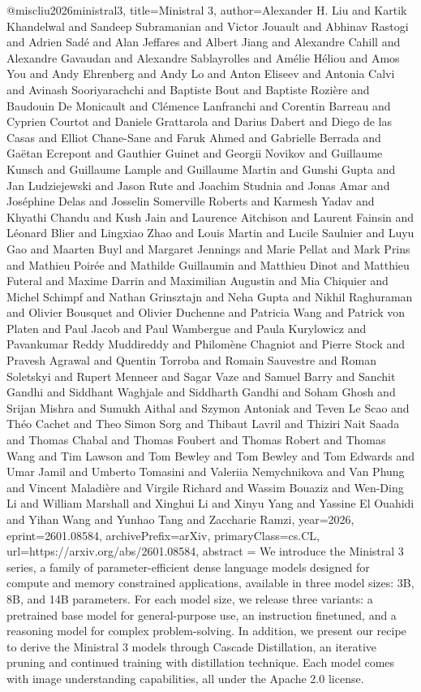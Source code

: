 {}@misc{liu2026ministral3,
      title={Ministral 3}, 
      author={Alexander H. Liu and Kartik Khandelwal and Sandeep Subramanian and Victor Jouault and Abhinav Rastogi and Adrien Sadé and Alan Jeffares and Albert Jiang and Alexandre Cahill and Alexandre Gavaudan and Alexandre Sablayrolles and Amélie Héliou and Amos You and Andy Ehrenberg and Andy Lo and Anton Eliseev and Antonia Calvi and Avinash Sooriyarachchi and Baptiste Bout and Baptiste Rozière and Baudouin De Monicault and Clémence Lanfranchi and Corentin Barreau and Cyprien Courtot and Daniele Grattarola and Darius Dabert and Diego de las Casas and Elliot Chane-Sane and Faruk Ahmed and Gabrielle Berrada and Gaëtan Ecrepont and Gauthier Guinet and Georgii Novikov and Guillaume Kunsch and Guillaume Lample and Guillaume Martin and Gunshi Gupta and Jan Ludziejewski and Jason Rute and Joachim Studnia and Jonas Amar and Joséphine Delas and Josselin Somerville Roberts and Karmesh Yadav and Khyathi Chandu and Kush Jain and Laurence Aitchison and Laurent Fainsin and Léonard Blier and Lingxiao Zhao and Louis Martin and Lucile Saulnier and Luyu Gao and Maarten Buyl and Margaret Jennings and Marie Pellat and Mark Prins and Mathieu Poirée and Mathilde Guillaumin and Matthieu Dinot and Matthieu Futeral and Maxime Darrin and Maximilian Augustin and Mia Chiquier and Michel Schimpf and Nathan Grinsztajn and Neha Gupta and Nikhil Raghuraman and Olivier Bousquet and Olivier Duchenne and Patricia Wang and Patrick von Platen and Paul Jacob and Paul Wambergue and Paula Kurylowicz and Pavankumar Reddy Muddireddy and Philomène Chagniot and Pierre Stock and Pravesh Agrawal and Quentin Torroba and Romain Sauvestre and Roman Soletskyi and Rupert Menneer and Sagar Vaze and Samuel Barry and Sanchit Gandhi and Siddhant Waghjale and Siddharth Gandhi and Soham Ghosh and Srijan Mishra and Sumukh Aithal and Szymon Antoniak and Teven Le Scao and Théo Cachet and Theo Simon Sorg and Thibaut Lavril and Thiziri Nait Saada and Thomas Chabal and Thomas Foubert and Thomas Robert and Thomas Wang and Tim Lawson and Tom Bewley and Tom Bewley and Tom Edwards and Umar Jamil and Umberto Tomasini and Valeriia Nemychnikova and Van Phung and Vincent Maladière and Virgile Richard and Wassim Bouaziz and Wen-Ding Li and William Marshall and Xinghui Li and Xinyu Yang and Yassine El Ouahidi and Yihan Wang and Yunhao Tang and Zaccharie Ramzi},
      year={2026},
      eprint={2601.08584},
      archivePrefix={arXiv},
      primaryClass={cs.CL},
      url={https://arxiv.org/abs/2601.08584},
      abstract = {We introduce the Ministral 3 series, a family of parameter-efficient dense language models designed for compute and memory constrained applications, available in three model sizes: 3B, 8B, and 14B parameters. For each model size, we release three variants: a pretrained base model for general-purpose use, an instruction finetuned, and a reasoning model for complex problem-solving. In addition, we present our recipe to derive the Ministral 3 models through Cascade Distillation, an iterative pruning and continued training with distillation technique. Each model comes with image understanding capabilities, all under the Apache 2.0 license.}
}
